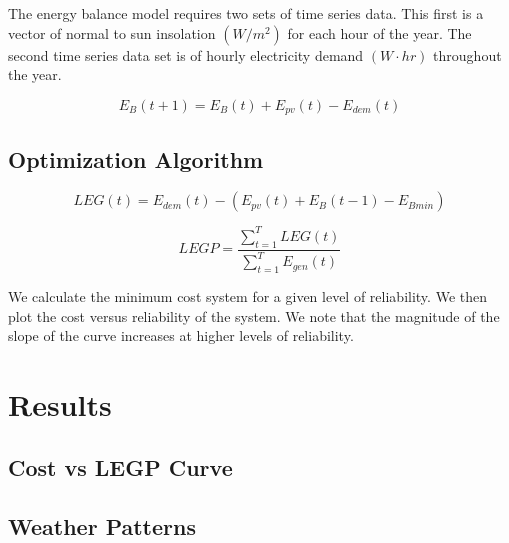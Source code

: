 \documentclass{article}
\begin{document}
The energy balance model requires two sets of time series data. 
This first is a vector of normal to sun insolation $\unit{(W/m^2)}$ for each hour of the year. The second time series data set is of hourly electricity demand $\unit{(W\cdot hr)}$ throughout the year. 



\begin{equation}
E_B (t+1) = E_B (t) + E_{pv} (t) - E_{dem} (t)
\end{equation}

\subsection{Optimization Algorithm}

\begin{equation}
LEG(t) = E_{dem} (t) - (E_{pv} (t)+E_B(t-1)-E_{Bmin})
\end{equation}






\begin{equation}
LEGP = \frac{\sum_{t=1}^T LEG(t)}{\sum_{t=1}^T E_{gen} (t)}
\end{equation}





We calculate the minimum cost system for a given level of reliability.
We then plot the cost versus reliability of the system.
We note that the magnitude of the slope of the curve increases at higher
levels of reliability.


\section{Results}
\subsection{Cost vs LEGP Curve}
\subsection{Weather Patterns}
\end{document}
